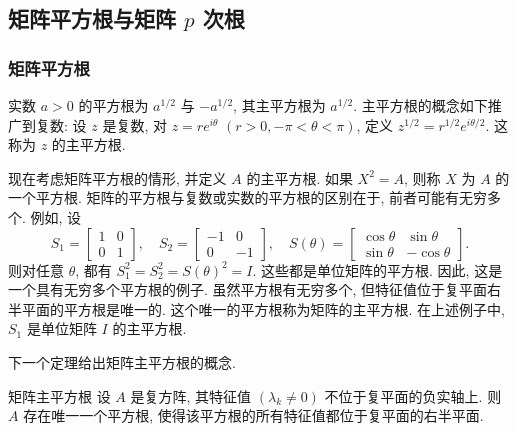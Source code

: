 \subsection{{矩阵平方根与矩阵 $p$ 次根}}\label{sec:matrix-roots}

\subsubsection{{矩阵平方根}}\label{subsec:newton-matrix-square-root}

{实数 $a>0$ 的平方根为 $a^{1/2}$ 与 $-a^{1/2}$, 其主平方根为 $a^{1/2}$. 主平方根的概念如下推广到复数: 设 $z$ 是复数, 对 $z=re^{i\theta}$ $(r>0,-\pi<\theta<\pi)$, 定义 $z^{1/2}=r^{1/2}e^{i\theta/2}$. 这称为 $z$ 的主平方根.}

{现在考虑矩阵平方根的情形, 并定义 $A$ 的主平方根. 如果 $X^2=A$, 则称 $X$ 为 $A$ 的一个平方根. 矩阵的平方根与复数或实数的平方根的区别在于, 前者可能有无穷多个. 例如, 设}
\[S_1=\begin{bmatrix}1&0\\0&1\end{bmatrix},\quad S_2=\begin{bmatrix}-1&0\\0&-1\end{bmatrix},\quad S(\theta)=\begin{bmatrix}\cos\theta&\sin\theta\\\sin\theta&-\cos\theta\end{bmatrix}.\]
{则对任意 $\theta$, 都有 $S_1^2=S_2^2=S(\theta)^2=I$. 这些都是单位矩阵的平方根. 因此, 这是一个具有无穷多个平方根的例子. 虽然平方根有无穷多个, 但特征值位于复平面右半平面的平方根是唯一的. 这个唯一的平方根称为矩阵的主平方根. 在上述例子中, $S_1$ 是单位矩阵 $I$ 的主平方根.}

{下一个定理给出矩阵主平方根的概念.}

\begin{Theorem}{{矩阵主平方根}}\label{thm:principal-matrix-square-root}
{设 $A$ 是复方阵, 其特征值 $(\lambda_k\ne0)$ 不位于复平面的负实轴上. 则 $A$ 存在唯一一个平方根, 使得该平方根的所有特征值都位于复平面的右半平面.}
\end{Theorem}

